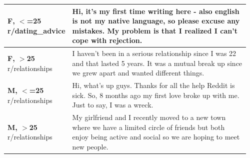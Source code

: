 \begin{tabular}{@{}p{0.15\linewidth}p{0.81\linewidth}@{}}
\toprule
\textbf{F, $<$=25} \newline r/dating\_advice & Hi, it's my first time writing here - also english is not my native language, so please excuse any mistakes. My problem is that I realized I can't cope with rejection. \\
\midrule
\textbf{F, $>$25} \newline r/relationships & I haven't been in a serious relationship since I was 22 and that lasted 5 years. It was a mutual break up since we grew apart and wanted different things. \\
\midrule
\textbf{M, $<$=25} \newline r/relationships & Hi, what's up guys. Thanks for all the help Reddit is sick. So, 8 months ago my first love broke up with me. Just to say, I was a wreck. \\
\midrule
\textbf{M, $>$25} \newline r/relationships & My girlfriend and I recently moved to a new town where we have a limited circle of friends but both enjoy being active and social so we are hoping to meet new people. \\
\bottomrule
\end{tabular}
